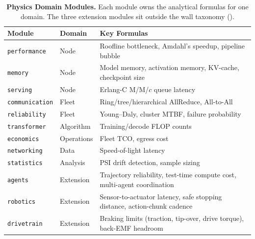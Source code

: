 \documentclass[10pt,twocolumn]{article}
\begin{document}
\begin{table}[!t]
\centering
\caption{\textbf{Physics Domain Modules.} Each module owns the analytical formulas for one domain. The three extension modules sit outside the wall taxonomy ().}
\label{tab:physics-modules}
\small
\renewcommand{\arraystretch}{1.08}
\begin{tabularx}{\columnwidth}{@{}l l X@{}}
\toprule
\textbf{Module} & \textbf{Domain} & \textbf{Key Formulas} \\
\midrule
\texttt{performance}    & Node        & Roofline bottleneck, Amdahl's speedup, pipeline bubble \\
\texttt{memory}         & Node        & Model memory, activation memory, KV-cache, checkpoint size \\
\texttt{serving}        & Node        & Erlang-C M/M/$c$ queue latency \\
\texttt{communication}  & Fleet       & Ring/tree/hierarchical AllReduce, All-to-All \\
\texttt{reliability}    & Fleet       & Young--Daly, cluster MTBF, failure probability \\
\texttt{transformer}    & Algorithm   & Training/decode FLOP counts \\
\texttt{economics}      & Operations  & Fleet TCO, egress cost \\
\texttt{networking}     & Data        & Speed-of-light latency \\
\texttt{statistics}     & Analysis    & PSI drift detection, sample sizing \\
\midrule
\texttt{agents}         & Extension   & Trajectory reliability, test-time compute cost, multi-agent coordination \\
\texttt{robotics}       & Extension   & Sensor-to-actuator latency, safe stopping distance, action-chunk cadence \\
\texttt{drivetrain}     & Extension   & Braking limits (traction, tip-over, drive torque), back-EMF headroom \\
\bottomrule
\end{tabularx}
\end{table}
\end{document}
